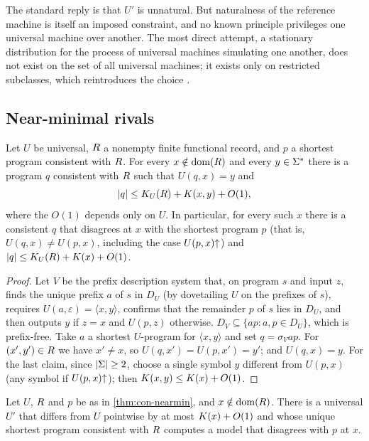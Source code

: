 \begin{remark}\label{con:rem:natural}
The standard reply is that $U'$ is unnatural. But naturalness of the
reference machine is itself an imposed constraint, and no known principle privileges
one universal machine over another. The most direct attempt, a stationary distribution
for the process of universal machines simulating one another, does not exist on the
set of all universal machines; it exists only on restricted subclasses, which
reintroduces the choice \citep{muller2010}.
\end{remark}

\subsection{Near-minimal rivals}

\begin{proposition}\label{thm:con-nearmin}
Let $U$ be universal, $R$ a nonempty finite functional record, and $p$ a shortest
program consistent with $R$. For every $x\notin\operatorname{dom}(R)$ and every $y\in\Sigma^{*}$
there is a program $q$ consistent with $R$ such that $U(q,x)=y$ and
\[
  |q|\le K_{U}(R)+K(x,y)+O(1),
\]
where the $O(1)$ depends only on $U$. In particular, for every such $x$ there is a
consistent $q$ that disagrees at $x$ with the shortest program $p$ (that is,
$U(q,x)\ne U(p,x)$, including the case $U(p,x)\mathord{\uparrow}$) and
$|q|\le K_{U}(R)+K(x)+O(1)$.
\end{proposition}

\begin{proof}
Let $V$ be the prefix description system that, on program $s$ and input $z$, finds the
unique prefix $a$ of $s$ in $D_U$ (by dovetailing $U$ on the prefixes of $s$), requires
$U(a,\varepsilon)=\langle x,y\rangle$, confirms that the remainder $p$ of $s$ lies in
$D_U$, and then outputs $y$ if $z=x$ and $U(p,z)$ otherwise. $D_V\subseteq\{ap : a,p\in
D_U\}$, which is prefix-free. Take $a$ a shortest $U$-program for $\langle x,y\rangle$
and set $q=\sigma_V ap$. For $(x',y')\in R$ we have $x'\ne x$, so
$U(q,x')=U(p,x')=y'$; and $U(q,x)=y$. For the last claim, since $|\Sigma|\ge2$, choose a
single symbol $y$ different from $U(p,x)$ (any symbol if $U(p,x)\mathord{\uparrow}$); then
$K(x,y)\le K(x)+O(1)$.
\end{proof}

\begin{corollary}\label{con:cor:promote}
Let $U$, $R$ and $p$ be as in \cref{thm:con-nearmin}, and $x\notin\operatorname{dom}(R)$. There
is a universal $U'$ that differs from $U$ pointwise by at most $K(x)+O(1)$ and whose
unique shortest program consistent with $R$ computes a model that disagrees with $p$
at $x$.
\end{corollary}

